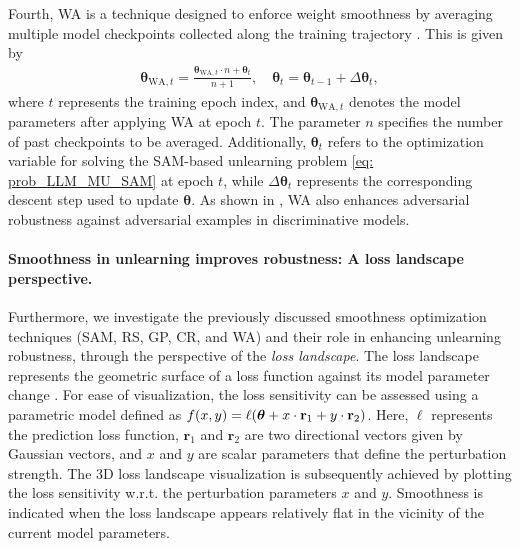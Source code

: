 Fourth, WA is a technique designed to enforce weight smoothness by averaging multiple model checkpoints collected along the training trajectory \citep{izmailov2018averaging}. 
This is given by
\begin{align}
\boldsymbol{\theta}_{\text{WA},t} = \frac{\boldsymbol{\theta}_{\text{WA},t} \cdot n + \boldsymbol{\theta}_{t}}{n + 1}, \quad 
    \boldsymbol{\theta}_{t} = \boldsymbol{\theta}_{t-1} + \Delta \boldsymbol{\theta}_{t} ,
\end{align}
where $t$ represents the training epoch index, and $\boldsymbol{\theta}_{\text{WA},t}$ denotes the model parameters after applying WA at epoch $t$. The parameter $n$ specifies the number of past checkpoints to be averaged. Additionally, $\boldsymbol{\theta}_{t}$ refers to the optimization variable for solving the SAM-based unlearning problem \eqref{eq: prob_LLM_MU_SAM} at epoch $t$, while $\Delta \boldsymbol{\theta}_{t}$ represents the corresponding descent step used to update $\boldsymbol{\theta}$.
As shown in \citep{chen2020robust}, WA also enhances adversarial robustness against adversarial examples in discriminative models.  %

\paragraph{Smoothness in unlearning improves robustness: A  loss landscape perspective.}
Furthermore, we investigate the previously discussed smoothness optimization techniques (SAM, RS, GP, CR, and WA) and their role in enhancing unlearning robustness, through the perspective of the \textit{loss landscape}.
The loss landscape represents the geometric surface of a loss function against its model parameter change \citep{li2018visualizing,hao2019visualizing,zan2022complementarity}. 
For ease of visualization, the loss sensitivity can be assessed using a parametric model defined as $f(x, y) = \ell({\boldsymbol{\theta}} + x \cdot \mathbf{r}_1 + y \cdot \mathbf{r}_2)$.
Here, $\ell$ represents the prediction loss function, $\mathbf{r}_1$ and $\mathbf{r}_2$ are two directional vectors given by Gaussian vectors, and  $x$ and $y$ are scalar parameters that define the perturbation strength. The 3D loss landscape visualization is subsequently achieved by plotting the loss sensitivity w.r.t. the perturbation parameters $x$ and $y$.
Smoothness is indicated when the loss landscape appears relatively flat in the vicinity of the current model parameters.

